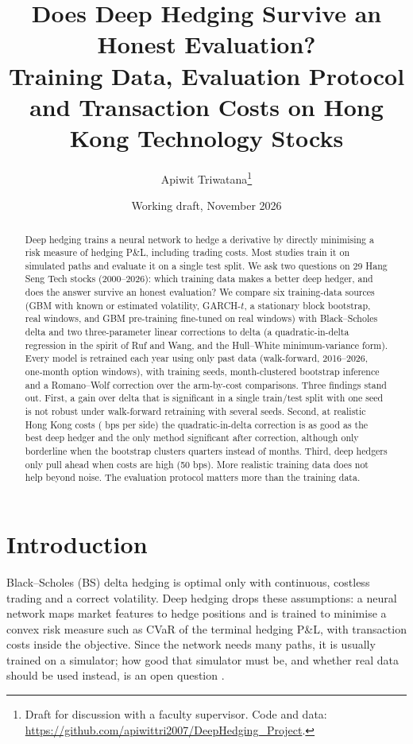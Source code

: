 \documentclass[11pt]{article}
\title{Does Deep Hedging Survive an Honest Evaluation?\\
\large Training Data, Evaluation Protocol and Transaction Costs on Hong Kong Technology Stocks}
\author{Apiwit Triwatana\thanks{Draft for discussion with a faculty supervisor. Code and data:
\url{https://github.com/apiwittri2007/DeepHedging_Project}.}}
\date{Working draft, November 2026}
\begin{document}
\maketitle

\begin{abstract}
Deep hedging trains a neural network to hedge a derivative by directly minimising a risk measure
of hedging P\&L, including trading costs. Most studies train it on simulated paths and evaluate it
on a single test split. We ask two questions on 29 Hang Seng Tech stocks (2000--2026):
which training data makes a better deep hedger, and does the answer survive an honest evaluation?
We compare six training-data sources (GBM with known or estimated volatility, GARCH-$t$, a
stationary block bootstrap, real windows, and GBM pre-training fine-tuned on real windows) with
Black--Scholes delta and two three-parameter linear corrections to delta (a quadratic-in-delta
regression in the spirit of Ruf and Wang, and the Hull--White minimum-variance form). Every model is retrained each year using
only past data (walk-forward, 2016--2026, \NTest{} one-month option windows), with \NSeeds{} training
seeds, month-clustered bootstrap inference and a Romano--Wolf correction over the
\NFamily{} arm-by-cost comparisons.
Three findings stand out. First, a gain over delta that is significant in a single train/test split with one
seed is not robust under walk-forward retraining with several seeds. Second, at realistic Hong Kong
costs (\FocusBps{} bps per side) the quadratic-in-delta correction is as good as the best deep hedger and
the only method significant after correction, although only borderline when the bootstrap clusters
quarters instead of months.
Third, deep hedgers only pull ahead when costs are high (50 bps). More realistic training data does not
help beyond noise. The evaluation protocol matters more than the training data.
\end{abstract}

\section{Introduction}
Black--Scholes (BS) delta hedging is optimal only with continuous, costless trading and a correct
volatility. Deep hedging \citep{buehler2019deep} drops these assumptions: a neural network maps
market features to hedge positions and is trained to minimise a convex risk measure such as
CVaR of the terminal hedging P\&L, with transaction costs inside the objective. Since the network
needs many paths, it is usually trained on a simulator; how good that simulator must be, and whether real
data should be used instead, is an open question
\citep{mikkila2023empirical,buehler2022drift,hashimoto2026realism}.
\end{document}

